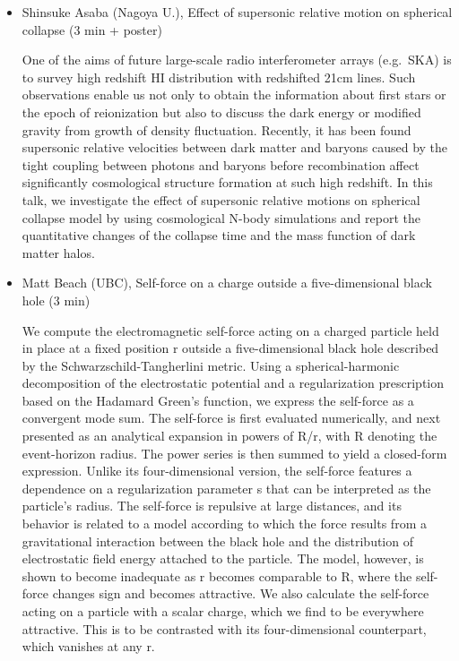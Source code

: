 \documentclass[letterpaper,12pt]{article}
\newcommand{\talk}[2]{{\fontspec{Lato Bold} #1,} {\fontspec{Lato Light Italic} #2}}
\begin{document}
\begin{itemize}
\setlength\itemsep{0pt}

\item \talk{Shinsuke Asaba (Nagoya U.)}{Effect of supersonic relative motion on spherical collapse (3 min + poster)}

One of the aims of future large-scale radio interferometer arrays (e.g.\ SKA) is to survey high redshift HI distribution with redshifted 21cm lines. Such observations enable us not only to obtain the information about first stars or the epoch of reionization but also to discuss the dark energy or modified gravity from growth of density fluctuation. Recently, it has been found supersonic relative velocities between dark matter and baryons caused by the tight coupling between photons and baryons before recombination affect significantly cosmological structure formation at such high redshift. In this talk, we investigate the effect of supersonic relative motions on spherical collapse model by using cosmological N-body simulations and report the quantitative changes of the collapse time and the mass function of dark matter halos.

\item \talk{Matt Beach (UBC)}{Self-force on a charge outside a five-dimensional black hole (3 min)}

We compute the electromagnetic self-force acting on a charged particle held in place at a fixed position r outside a five-dimensional black hole described by the Schwarzschild-Tangherlini metric. Using a spherical-harmonic decomposition of the electrostatic potential and a regularization prescription based on the Hadamard Green's function, we express the self-force as a convergent mode sum. The self-force is first evaluated numerically, and next presented as an analytical expansion in powers of R/r, with R denoting the event-horizon radius. The power series is then summed to yield a closed-form expression. Unlike its four-dimensional version, the self-force features a dependence on a regularization parameter s that can be interpreted as the particle's radius. The self-force is repulsive at large distances, and its behavior is related to a model according to which the force results from a gravitational interaction between the black hole and the distribution of electrostatic field energy attached to the particle. The model, however, is shown to become inadequate as r becomes comparable to R, where the self-force changes sign and becomes attractive. We also calculate the self-force acting on a particle with a scalar charge, which we find to be everywhere attractive. This is to be contrasted with its four-dimensional counterpart, which vanishes at any r. 


\end{itemize}
\end{document}
